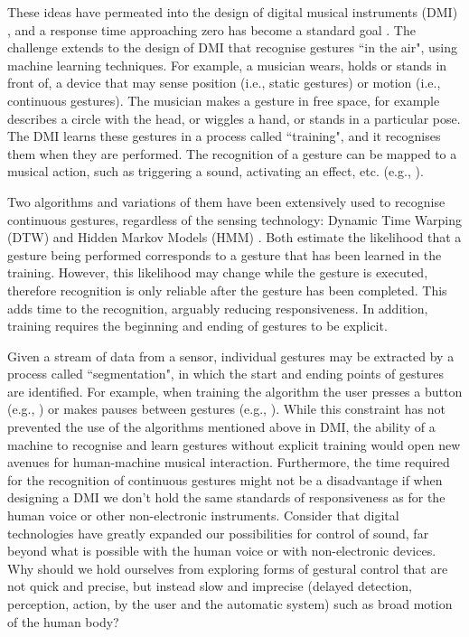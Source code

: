 \documentclass{nime-alternate_ADJ} %
\begin{document}
These ideas have permeated into the design of digital musical instruments (DMI) \cite{Moore_1988}, and a response time approaching zero has become a standard goal \cite{Wessel_Wright_2002, Jack_etal_2018, McPherson_etal_2016}. The challenge extends to the design of DMI that recognise gestures ``in the air", using machine learning techniques. For example, a musician wears, holds or stands in front of, a device that may sense position (i.e., static gestures) or motion (i.e., continuous gestures). The musician makes a gesture in free space, for example describes a circle with the head, or wiggles a hand, or stands in a particular pose. The DMI learns these gestures in a process called ``training", and it recognises them when they are performed. The recognition of a gesture can be mapped to a musical action, such as triggering a sound, activating an effect, etc. (e.g., \cite{Gillian_2011}).

Two algorithms and variations of them have been extensively used to recognise continuous gestures, regardless of the sensing technology: Dynamic Time Warping (DTW) \cite{Gillian_etal_2011} and Hidden Markov Models (HMM) \cite{Bevilacqua_etal_2010}. Both estimate the likelihood that a gesture being performed corresponds to a gesture that has been learned in the training. However, this likelihood may change while the gesture is executed, therefore recognition is only reliable after the gesture has been completed. This adds time to the recognition, arguably reducing responsiveness. In addition, training requires the beginning and ending of gestures to be explicit.

Given a stream of data from a sensor, individual gestures may be extracted by a process called ``segmentation", in which the start and ending points of gestures are identified. For example, when training the algorithm the user presses a button (e.g., \cite{Merril_Paradiso_2005}) or makes pauses between gestures (e.g., \cite{Murad_etal_2017}). While this constraint has not prevented the use of the algorithms mentioned above in DMI, the ability of a machine to recognise and learn gestures without explicit training would open new avenues for human-machine musical interaction. Furthermore, the time required for the recognition of continuous gestures might not be a disadvantage if when designing a DMI we don't hold the same standards of responsiveness as for the human voice or other non-electronic instruments. Consider that digital technologies have greatly expanded our possibilities for control of sound, far beyond what is possible with the human voice or with non-electronic devices. Why should we hold ourselves from exploring forms of gestural control that are not quick and precise, but instead slow and imprecise (delayed detection, perception, action, by the user and the automatic system) such as broad motion of the human body?
	
\end{document}
